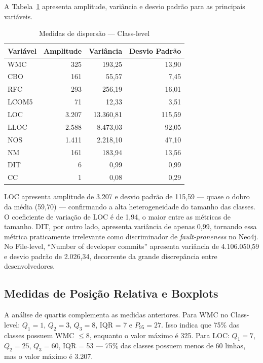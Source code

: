 \documentclass[12pt]{article}
\begin{document}
A Tabela~\ref{tab:dispersao_class} apresenta amplitude, variância e desvio padrão para as principais variáveis.

\begin{table}[H]
\centering
\caption{Medidas de dispersão --- Class-level}
\label{tab:dispersao_class}
\footnotesize
\begin{tabular}{lrrr}
\toprule
\textbf{Variável} & \textbf{Amplitude} & \textbf{Variância} & \textbf{Desvio Padrão} \\
\midrule
WMC   &     325 &      193,25 &  13,90 \\
CBO   &     161 &       55,57 &   7,45 \\
RFC   &     293 &      256,19 &  16,01 \\
LCOM5 &      71 &       12,33 &   3,51 \\
LOC   &   3.207 &   13.360,81 & 115,59 \\
LLOC  &   2.588 &    8.473,03 &  92,05 \\
NOS   &   1.411 &    2.218,10 &  47,10 \\
NM    &     161 &      183,94 &  13,56 \\
DIT   &       6 &        0,99 &   0,99 \\
CC    &       1 &        0,08 &   0,29 \\
\bottomrule
\end{tabular}
\end{table}

LOC apresenta amplitude de 3.207 e desvio padrão de 115,59 --- quase o dobro da média (59,70) --- confirmando a alta heterogeneidade do tamanho das classes. O coeficiente de variação de LOC é de 1,94, o maior entre as métricas de tamanho. DIT, por outro lado, apresenta variância de apenas 0,99, tornando essa métrica praticamente irrelevante como discriminador de \textit{fault-proneness} no Neo4j. No File-level, ``Number of developer commits'' apresenta variância de 4.106.050,59 e desvio padrão de 2.026,34, decorrente da grande discrepância entre desenvolvedores.

\subsection{Medidas de Posição Relativa e Boxplots}

A análise de quartis complementa as medidas anteriores. Para WMC no Class-level: $Q_1 = 1$, $Q_2 = 3$, $Q_3 = 8$, IQR = 7 e $P_{95} = 27$. Isso indica que 75\% das classes possuem WMC $\leq 8$, enquanto o valor máximo é 325. Para LOC: $Q_1 = 7$, $Q_2 = 25$, $Q_3 = 60$, IQR = 53 --- 75\% das classes possuem menos de 60 linhas, mas o valor máximo é 3.207.
\end{document}
